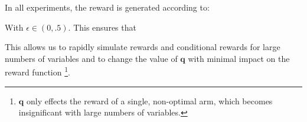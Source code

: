 In all experiments, the reward is generated according to:

With $\epsilon \in (0,.5)$. This ensures that 

This allows us to rapidly simulate rewards and conditional rewards for large numbers of variables and to change the value of $\boldsymbol{q}$ with minimal impact on the reward function \footnote{$\boldsymbol{q}$ only effects the reward of a single, non-optimal arm, which becomes insignificant with large numbers of variables.}. 

\iffalse
\begin{figure}
\caption{Final regret versus number of variables $N$ for UCB with $\alpha = 2$, Causal-Explore-Exploit with $m=2$ and with $m=N$ and horizon $T = 10,000$ . Error bars show standard deviation over 100 simulations. The regret for UCB grows linearly with the number of variables, whist for Causal-Explore-Exploit with fixed $m$, the growth is sub-logarthmic.  }
\label{fig:known_q_r_vs_N}
\centering
\texttt{[image: exp\_regret\_vs\_N\_T10000\_sims100\_20151229\_113550.pdf]}
\end{figure}
\fi

\iffalse
\begin{figure}
\caption{Cumulative regret over time for $N = 17$ for UCB with $\alpha=2$, Causal-Explore-Exploit with $m=2$ and Causal-Explore-Exploit with $m=N$. Shaded region shows standard deviation over 100 simulations. The Causal-Explore-Exploit algorithm incurs linear regret during the exploration phase, after which it selects the optimal arm with high probability. For $m=2$, we have $K \sim m^{2/3}T^{1/3}$ and see that we are in the regime in which Causal-Explore-Exploit outperforms UCB.}
\label{fig:known_q_r_vs_t}
\centering
\texttt{[image: exp\_regret\_vs\_t\_T10000\_N17\_sims100\_20151229\_120647.pdf]}
\end{figure}
\fi

